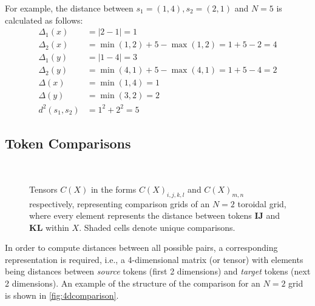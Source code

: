 For example, the distance between $s_1=(1,4),s_2=(2,1)$ and $N=5$ is calculated as follows:%
\begin{align}
    \Delta_1(x)&=\lvert 2-1\rvert=1\nonumber\\
    \Delta_2(x)&=\min{(1,2)}+5-\max{(1,2)}=1+5-2=4\nonumber\\
    \Delta_1(y)&=\lvert 1-4\rvert=3\nonumber\\
    \Delta_2(y)&=\min{(4,1)}+5-\max{(4,1)}=1+5-4=2\nonumber\\
    \Delta(x)&=\min{(1,4)}=1\nonumber\\
    \Delta(y)&=\min{(3,2)}=2\nonumber\\
    d^2(s_1,s_2)&=1^2+2^2=5
\end{align}

\subsection{Token Comparisons}%
\label{sub:token_comparisons}
\begin{figure}[htpb]
    \centering
    \begin{subfigure}[t]{0.5\textwidth}
    \begin{center}
    \end{center}
    \caption{}
    \label{fig:4dcomparison}
    \end{subfigure}%
    ~
    \begin{subfigure}[t]{0.5\textwidth}
    \begin{center}
    \end{center}
    \caption{}
    \label{fig:2dcomparison}
    \end{subfigure}

    \caption{Tensors $C(X)$ in the forms $C(X)_{i,j,k,l}$ and $C(X)_{m,n}$ respectively, representing comparison grids of an $N=2$ toroidal grid, where every element represents the distance between tokens $\bm{IJ}$ and $\bm{KL}$ within $X$. Shaded cells denote unique comparisons.}%
    \label{fig:comparisonGrids}
\end{figure}

In order to compute distances between all possible pairs, a corresponding representation is required, i.e., a 4-dimensional matrix (or tensor) with elements being distances between \emph{source} tokens (first 2 dimensions) and \emph{target} tokens (next 2 dimensions). An example of the structure of the comparison for an $N=2$ grid is shown in \autoref{fig:4dcomparison}.

